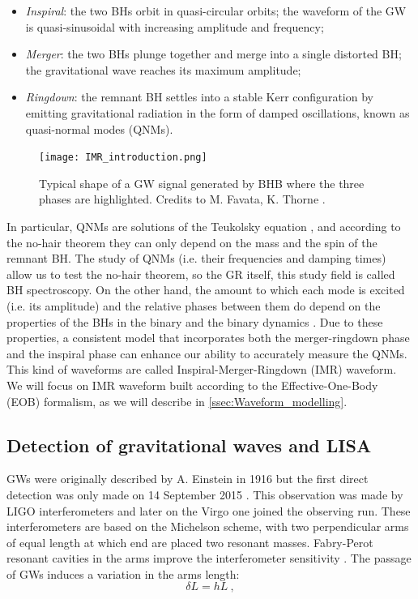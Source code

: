 \begin{itemize}
   \item \textit{Inspiral}: the two BHs orbit in quasi-circular orbits; the waveform of the GW is quasi-sinusoidal with increasing amplitude and frequency;
   \item \textit{Merger}: the two BHs plunge together and merge into a single distorted BH; the gravitational wave reaches its maximum amplitude;
   \item \textit{Ringdown}: the remnant BH settles into a stable Kerr configuration by emitting gravitational radiation in the form of damped oscillations, known as quasi-normal modes (QNMs).
\end{itemize}

\begin{figure}[h!]
    \centering
    \texttt{[image: IMR\_introduction.png]}
    \caption{Typical shape of a GW signal generated by BHB where the three phases are highlighted. Credits to M. Favata, K. Thorne \cite{favata}. }
    \label{fig:IMR_introduction}
\end{figure}

In particular, QNMs are solutions of the Teukolsky equation \cite{zhao2022quasinormalmodesblack}, and according to the no-hair theorem they can only depend on the mass and the spin of the remnant BH. 
The study of QNMs (i.e. their frequencies and damping times) allow us to test the no-hair theorem, so the GR itself, this study field is called BH spectroscopy. On the other hand, the amount to which each mode is excited (i.e. its amplitude) and the relative phases between them do depend on the properties of the BHs in the binary and the binary dynamics \cite{Flanagan_1998, forteza2022novelringdownamplitudephaseconsistency}.
Due to these properties, a consistent model that incorporates both the merger-ringdown phase and the inspiral phase can enhance our ability to accurately measure the QNMs. This kind of waveforms are called Inspiral-Merger-Ringdown (IMR) waveform. We will focus on IMR waveform built according to the Effective-One-Body (EOB) formalism, as we will describe in \ref{ssec:Waveform_modelling}.


\subsection{Detection of gravitational waves and LISA}
\label{Detection_of_GWs}

GWs were originally described  by A. Einstein in 1916 but the first direct detection was only made on 14 September 2015 \cite{Abbott_2016}. This observation was made by LIGO interferometers and later on the Virgo one joined the observing run. These interferometers are based on the Michelson scheme, with two perpendicular arms of equal length at which end are placed two resonant masses. Fabry-Perot resonant cavities in the arms improve the interferometer sensitivity \cite{Accadia_2012, Aasi_2015}. The passage of GWs induces a variation in the arms length: 
\begin{equation}
	\delta L = hL \:,
\end{equation}

